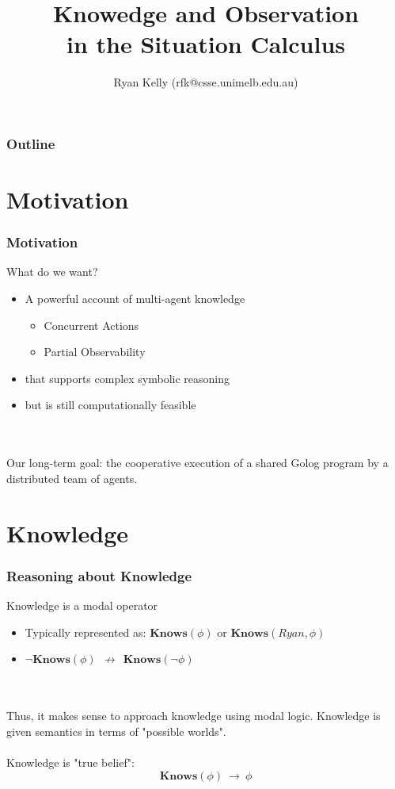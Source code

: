 \documentclass{beamer}
\title{Knowedge and Observation\\ in the Situation Calculus}
\author{Ryan Kelly (rfk@csse.unimelb.edu.au)}
\begin{document}
\begin{frame}
  \titlepage
\end{frame}

\begin{frame}
  \frametitle{Outline}
  \tableofcontents
\end{frame}

\section{Motivation}

\begin{frame}
\frametitle{Motivation}
What do we want?
\begin{itemize}
\item A powerful account of multi-agent knowledge
  \begin{itemize}
  \item Concurrent Actions
  \item Partial Observability
  \end{itemize}
\pause
\item that supports complex symbolic reasoning
\pause
\item but is still computationally feasible
\end{itemize}
\ \\
\ \\
\pause
Our long-term goal: the cooperative execution of a shared Golog program
by a distributed team of agents.
\end{frame}


\section{Knowledge}

\begin{frame}
\frametitle{Reasoning about Knowledge}

Knowledge is a modal operator
\begin{itemize}
\item Typically represented as: $\mathbf{Knows}(\phi)$ or $\mathbf{Knows}(Ryan,\phi)$
\item $\neg\mathbf{Knows}(\phi)\ \ \not\rightarrow\ \ \mathbf{Knows}(\neg\phi)$
\end{itemize}
\ \\
\ \\
Thus, it makes sense to approach knowledge using modal logic.
Knowledge is given semantics in terms of "possible worlds".
\ \\
\ \\
\pause
Knowledge is "true belief":
\[ \mathbf{Knows}(\phi)\ \rightarrow\ \phi \]

\end{frame}
\end{document}

